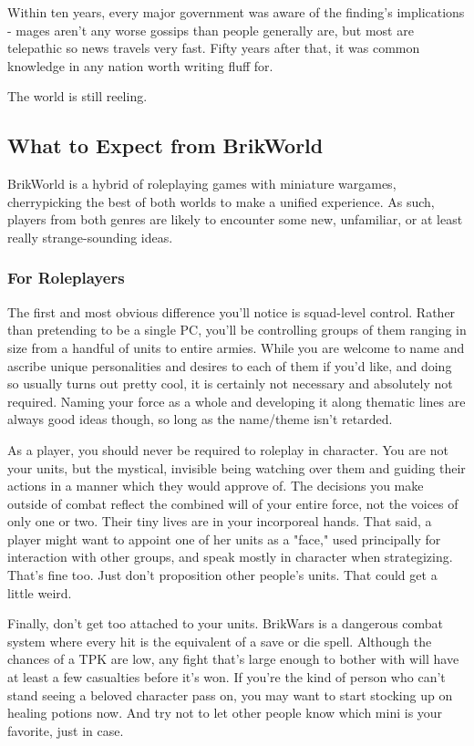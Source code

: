 \documentclass[12pt,a4paper,twocolumn]{article}
\begin{document}
Within ten years, every major government was aware of the finding's implications - mages aren't any worse gossips than people generally are, but most are telepathic so news travels very fast.  Fifty years after that, it was common knowledge in any nation worth writing fluff for.

The world is still reeling.
\subsection{What to Expect from BrikWorld}
BrikWorld is a hybrid of roleplaying games with miniature wargames, cherrypicking the best of both worlds to make a unified experience.  As such, players from both genres are likely to encounter some new, unfamiliar, or at least really strange-sounding ideas.

\subsubsection{For Roleplayers}
The first and most obvious difference you'll notice is squad-level control.  Rather than pretending to be a single PC, you'll be controlling groups of them ranging in size from a handful of units to entire armies.  While you are welcome to name and ascribe unique personalities and desires to each of them if you'd like, and doing so usually turns out pretty cool, it is certainly not necessary and absolutely not required.  Naming your force as a whole and developing it along thematic lines are always good ideas though, so long as the name/theme isn't retarded.

As a player, you should never be required to roleplay in character.  You are not your units, but the mystical, invisible being watching over them and guiding their actions in a manner which they would approve of.  The decisions you make outside of combat reflect the combined will of your entire force, not the voices of only one or two.  Their tiny lives are in your incorporeal hands.  That said, a player might want to appoint one of her units as a "face," used principally for interaction with other groups, and speak mostly in character when strategizing.  That's fine too.  Just don't proposition other people's units.  That could get a little weird.

Finally, don't get too attached to your units.  BrikWars is a dangerous combat system where every hit is the equivalent of a save or die spell.  Although the chances of a TPK are low, any fight that's large enough to bother with will have at least a few casualties before it's won.  If you're the kind of person who can't stand seeing a beloved character pass on, you may want to start stocking up on healing potions now.  And try not to let other people know which mini is your favorite, just in case.
\end{document}
